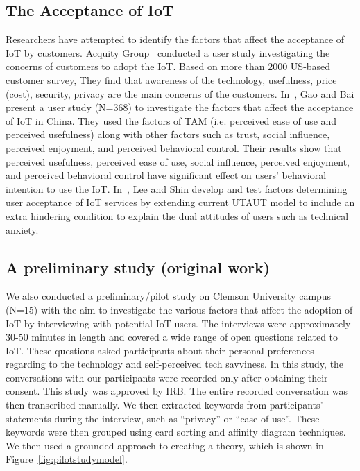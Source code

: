 \subsection{The Acceptance of IoT}
Researchers have attempted to identify the factors that affect the acceptance of IoT by customers. Acquity Group~\cite{acquity2014internet} conducted a user study investigating the concerns of customers to adopt the IoT. Based on more than 2000 US-based customer survey, They find that awareness of the technology, usefulness, price (cost), security, privacy are the main concerns of the customers. In~\cite{gao2014unified}, Gao and Bai present a user study (N=368) to investigate the factors that affect the acceptance of IoT in China. They used the factors of TAM (i.e. perceived ease of use and perceived usefulness) along with other factors such as trust, social influence, perceived enjoyment, and perceived behavioral control. Their results show that perceived usefulness, perceived ease of use, social influence, perceived enjoyment, and perceived behavioral control have significant effect on users' behavioral intention to use the IoT. In~\cite{lee2019empirical}, Lee and Shin develop and test factors determining user acceptance of IoT services by extending current UTAUT model to include an extra hindering condition to explain the dual attitudes of users such as technical anxiety.

\subsection{A preliminary study (original work)}
We also conducted a preliminary/pilot study on Clemson University campus (N=15) with the aim to investigate the various factors that affect the adoption of IoT by interviewing with potential IoT users. The interviews were approximately 30-50 minutes in length and covered a wide range of open questions related to IoT. These questions asked participants about their personal preferences regarding to the technology and self-perceived tech savviness. In this study, the conversations with our participants were recorded only after obtaining their consent. This study was approved by IRB. The entire recorded conversation was then transcribed manually. We then extracted keywords from participants' statements during the interview, such as ``privacy'' or ``ease of use''. These keywords were then grouped using card sorting and affinity diagram techniques. We then used a grounded approach to creating a theory, which is shown in Figure~\ref{fig:pilotstudymodel}.


